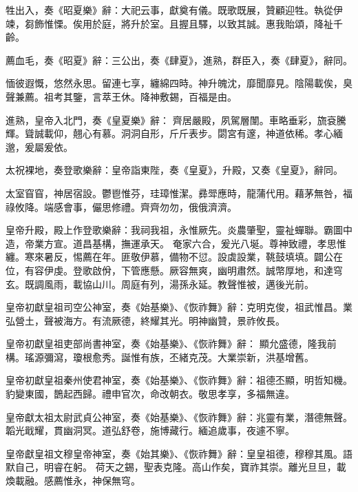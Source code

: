 \begin{pinyinscope}
 牲出入，奏《昭夏樂》辭：大祀云事，獻奠有儀。既歌既展，贊顧迎牲。執從伊竦，芻飾惟慄。俟用於庭，將升於室。且握且驛，以致其誠。惠我貽頌，降祉千齡。



 薦血毛，奏《昭夏》辭：三公出，奏《肆夏》，進熟，群臣入，奏《肆夏》，辭同。



 愐彼遐慨，悠然永思。留連七享，纏綿四時。神升魄沈，靡聞靡見。陰陽載俟，臭聲兼薦。祖考其鑒，言萃王休。降神敷錫，百福是由。



 進熟，皇帝入北門，奏《皇夏樂》辭：
 齊居嚴殿，夙駕層闈。車略垂彩，旒袞騰輝。聳誠載仰，翹心有慕。洞洞自形，斤斤表步。閟宮有邃，神道依稀。孝心緬邈，爰屬爰依。



 太祝裸地，奏登歌樂辭：皇帝詣東陛，奏《皇夏》，升殿，又奏《皇夏》，辭同。



 太室窅窅，神居宿設。鬱鬯惟芬，珪璋惟潔。彞斝應時，龍蒲代用。藉茅無咎，福祿攸降。端感會事，儼思修禮。齊齊勿勿，俄俄濟濟。



 皇帝升殿，殿上作登歌樂辭：我祠我祖，永惟厥先。炎農肇聖，靈祉蟬聯。霸圖中造，帝業方宣。道昌基構，撫運承天。
 奄家六合，爰光八埏。尊神致禮，孝思惟纏。寒來暑反，惕薦在年。匪敬伊慕，備物不愆。設虡設業，鞉鼓填填。闢公在位，有容伊虔。登歌啟佾，下管應懸。厥容無爽，幽明肅然。誠幣厚地，和達穹玄。既調風雨，載協山川。周庭有列，湯孫永延。教聲惟被，邁後光前。



 皇帝初獻皇祖司空公神室，奏《始基樂》、《恢祚舞》辭：克明克俊，祖武惟昌。業弘營土，聲被海方。有流厥德，終耀其光。明神幽贊，景祚攸長。



 皇帝初獻皇祖吏部尚書神室，奏《始基樂》、《恢祚舞》辭：
 顯允盛德，隆我前構。瑤源彌瀉，瓊根愈秀。誕惟有族，丕緒克茂。大業崇新，洪基增舊。



 皇帝初獻皇祖秦州使君神室，奏《始基樂》、《恢祚舞》辭：祖德丕顯，明哲知機。豹變東國，鵲起西歸。禮申官次，命改朝衣。敬思孝享，多福無違。



 皇帝獻太祖太尉武貞公神室，奏《始基樂》、《恢祚舞》辭：兆靈有業，潛德無聲。韜光戢耀，貫幽洞冥。道弘舒卷，施博藏行。緬追歲事，夜遽不寧。



 皇帝獻皇祖文穆皇帝神室，奏《始其樂》、《恢祚舞》辭：皇皇祖德，穆穆其風。語默自己，明睿在躬。
 荷天之錫，聖表克隆。高山作矣，寶祚其崇。離光旦旦，載煥載融。感薦惟永，神保無穹。




\end{pinyinscope}
